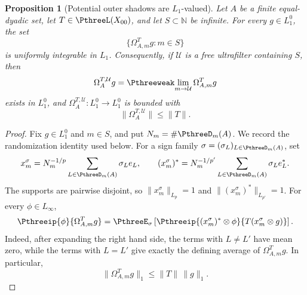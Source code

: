 \documentclass[11pt,reqno]{amsart}
\makeatletter
\theoremstyle{plain}
\newtheorem{proposition}[proposition]{Proposition}
\theoremstyle{definition}
\newcommand{\N}{\mathbb N}
\newcounter{problempaper}
\newenvironment{problempaperbody}{%
  \setcounter{subsection}{0}%
  \setcounter{subsubsection}{0}%
  \setcounter{paragraph}{0}%
  \renewcommand{\thesubsection}{\arabic{subsection}}%
  \renewcommand{\thesubsubsection}{\thesubsection.\arabic{subsubsection}}%
  \renewcommand{\theparagraph}{\thesubsubsection.\arabic{paragraph}}%
  \let\problem@outersection\section
  \let\problem@outersubsection\subsection
  \let\problem@outersubsubsection\subsubsection
  \let\problem@outerparagraph\paragraph
  \let\section\problem@papersection
  \let\subsection\problem@papersubsection
  \let\subsubsection\problem@papersubsubsection
}{%
  \let\section\problem@outersection
  \let\subsection\problem@outersubsection
  \let\subsubsection\problem@outersubsubsection
  \let\paragraph\problem@outerparagraph
}
\newcommand{\problem@target}[2]{%
  \hypertarget{problem-\theproblempaper-#1-#2}{}%
}
\newcommand{\problem@paperheading}[3]{%
  \par\bigskip
  \problem@target{#1}{#2}%
  \noindent{\large\bfseries #2.\quad #3\par}%
  \nobreak\smallskip
}
\newcommand{\problem@papersubheading}[3]{%
  \par\medskip
  \problem@target{#1}{#2}%
  \noindent{\normalsize\bfseries #2.\quad #3\par}%
  \nobreak\smallskip
}
\newcommand{\problem@papersubsubheading}[3]{%
  \par\smallskip
  \problem@target{#1}{#2}%
  \noindent{\normalsize\itshape #2.\quad #3.\ }%
}
\def\problem@papersection{%
  \@ifstar{\problem@papersectionstar}{\problem@papersectionnostar}%
}
\def\problem@papersectionstar#1{%
  \par\bigskip\noindent{\large\bfseries #1\par}\nobreak\smallskip
}
\def\problem@papersectionnostar#1{%
  \refstepcounter{subsection}%
  \setcounter{subsubsection}{0}%
  \setcounter{paragraph}{0}%
  \problem@paperheading{section}{\thesubsection}{#1}%
  \problem@writecontentsline{section}{\thesubsection}{#1}%
}
\def\problem@papersubsection{%
  \@ifstar{\problem@papersubsectionstar}{\problem@papersubsectionnostar}%
}
\def\problem@papersubsectionstar#1{%
  \par\medskip\noindent{\normalsize\bfseries #1\par}\nobreak\smallskip
}
\def\problem@papersubsectionnostar#1{%
  \refstepcounter{subsubsection}%
  \setcounter{paragraph}{0}%
  \problem@papersubheading{subsection}{\thesubsubsection}{#1}%
  \problem@writecontentsline{subsection}{\thesubsubsection}{#1}%
}
\def\problem@papersubsubsection{%
  \@ifstar{\problem@papersubsubsectionstar}{\problem@papersubsubsectionnostar}%
}
\def\problem@papersubsubsectionstar#1{%
  \par\smallskip\noindent{\normalsize\itshape #1.\ }%
}
\def\problem@papersubsubsectionnostar#1{%
  \refstepcounter{paragraph}%
  \problem@papersubsubheading{subsubsection}{\theparagraph}{#1}%
  \problem@writecontentsline{subsubsection}{\theparagraph}{#1}%
}
\newcommand{\problem@writecontentsline}[3]{%
  \begingroup
  \protected@write\@auxout{}{%
    \string\problemcontentsentry{\theproblempaper}{#1}{#2}{#3}{\thepage}%
  }%
  \endgroup
}
\newcommand{\problemcontentsentry}[5]{%
  \@ifundefined{problemcontents@#1}{%
    \expandafter\gdef\csname problemcontents@#1\endcsname{}%
  }{}%
  \expandafter\g@addto@macro\csname problemcontents@#1\endcsname{%
    \problemcontentsline{#1}{#2}{#3}{#4}{#5}%
  }%
}
\newcommand{\problemcontentslink}[4]{%
  \hyperlink{problem-#1-#2-#3}{#4}%
}
\newcommand{\problemcontentsline}[5]{%
  \ifstrequal{#2}{section}{%
    \par\noindent
    \problemcontentslink{#1}{#2}{#3}{\makebox[2.5em][l]{#3}#4}%
    \nobreak\dotfill
    \problemcontentslink{#1}{#2}{#3}{#5}\par
  }{%
    \ifstrequal{#2}{subsection}{%
      \par\noindent\hspace*{1.5em}%
      \problemcontentslink{#1}{#2}{#3}{\makebox[3.5em][l]{#3}#4}%
      \nobreak\dotfill
      \problemcontentslink{#1}{#2}{#3}{#5}\par
    }{%
      \par\noindent\hspace*{3em}%
      \problemcontentslink{#1}{#2}{#3}{\makebox[4.5em][l]{#3}#4}%
      \nobreak\dotfill
      \problemcontentslink{#1}{#2}{#3}{#5}\par
    }%
  }%
}
\makeatother
\begin{document}
\begin{problempaperbody}
\begin{proposition}[Potential outer shadows are $L_1$-valued]
\label{p3:prop:shadow}
Let $A$ be a finite equal-dyadic set, let $T\in\PthreeL(X_{00})$, and let $S\subset\N$ be infinite. For every $g\in L_1^0$, the set
\begin{equation*}
        \{\Omega_{A,m}^Tg:m\in S\}
\end{equation*}
is uniformly integrable in $L_1$. Consequently, if $\mathcal U$ is a free ultrafilter containing $S$, then
\begin{equation*}
        \Omega_A^{T,\mathcal U}g = \Pthreeweak\!\lim_{m\to\mathcal U}\Omega_{A,m}^Tg
\end{equation*}
exists in $L_1^0$, and $\Omega_A^{T,\mathcal U}\colon L_1^0\to L_1^0$ is bounded with
\begin{equation*}
        \|\Omega_A^{T,\mathcal U}\|\leq \|T\| .
\end{equation*}
\end{proposition}

\begin{proof}
Fix $g\in L_1^0$ and $m\in S$, and put $N_m=\#\PthreeD_m(A)$. We record the randomization identity used below. For a sign family $\sigma=(\sigma_L)_{L\in\PthreeD_m(A)}$, set
\begin{equation*}
        x_m^\sigma=N_m^{-1/p}\sum_{L\in\PthreeD_m(A)}\sigma_Le_L,\qquad (x_m^\sigma)^*=N_m^{-1/p'}\sum_{L\in\PthreeD_m(A)}\sigma_Le_L^*.
\end{equation*}
The supports are pairwise disjoint, so $\|x_m^\sigma\|_{L_p}=1$ and $\|(x_m^\sigma)^*\|_{L_{p'}}=1$. For every $\phi\in L_\infty$,
\begin{equation}
\label{p3:eq:shadow-sign-average}
        \Pthreeip{\phi}{\Omega_{A,m}^Tg}=\PthreeE_\sigma\left[\Pthreeip{(x_m^\sigma)^*\otimes\phi}{T(x_m^\sigma\otimes g)}\right].
\end{equation}
Indeed, after expanding the right hand side, the terms with $L\ne L'$ have mean zero, while the terms with $L=L'$ give exactly the defining average of $\Omega_{A,m}^Tg$. In particular,
\begin{equation}
\label{p3:eq:shadow-uniform-l1-bound}
        \|\Omega_{A,m}^Tg\|_1\leq\|T\|\,\|g\|_1.
\end{equation}


\end{proof}
\end{problempaperbody}
\end{document}
